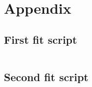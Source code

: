 \documentclass[a4paper]{article}
\begin{document}
\pagebreak
\section*{Appendix}

\subsection*{First fit script}
\inputminted{python}{../fit1.py}

\subsection*{Second fit script}
\inputminted{python}{../fit2.py}
\end{document}
